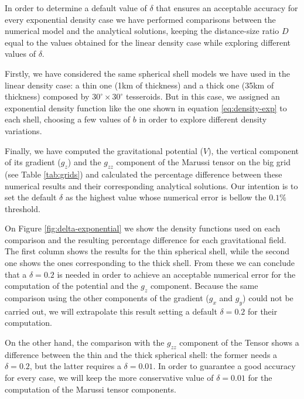 \documentclass[extra]{gji}
\begin{document}
In order to determine a default value of $\delta$ that ensures an 
acceptable accuracy for every exponential density case we have 
performed comparisons between the numerical model and the analytical 
solutions, keeping the distance-size ratio $D$ equal to the values 
obtained for the linear density case while exploring different values of 
$\delta$.

Firstly, we have considered the same spherical shell models we have 
used in the linear density case: a thin one (1km of thickness) and a 
thick one (35km of thickness) composed by $30^\circ \times 30^\circ$ 
tesseroids.
But in this case, we assigned an exponential density function like the 
one shown in equation \ref{eq:density-exp} to each shell, choosing 
a few values of $b$ in order to explore different density 
variations.

Finally, we have computed the gravitational potential ($V$), the 
vertical component of its gradient ($g_z$) and the $g_{zz}$ component of 
the Marussi tensor on the big grid (see Table \ref{tab:grids}) and 
calculated the percentage difference between these numerical results and 
their corresponding analytical solutions.
Our intention is to set the default $\delta$ as the highest value whose 
numerical error is bellow the $0.1\%$ threshold.

On Figure \ref{fig:delta-exponential} we show the density functions 
used on each comparison and the resulting percentage difference for each 
gravitational field.
The first column shows the results for the thin spherical shell, while the 
second one shows the ones corresponding to the thick shell.
From these we can conclude that a $\delta = 0.2$ is needed in order to 
achieve an acceptable numerical error for the computation of the 
potential and the $g_z$ component.
Because the same comparison using the other components of the gradient ($g_x$ 
and $g_y$) could not be carried out, we will extrapolate this result 
setting a default $\delta = 0.2$ for their computation.

On the other hand, the comparison with the $g_{zz}$ component of the 
Tensor shows a difference between the thin and the thick spherical 
shell: the former needs a $\delta = 0.2$, but the latter requires a 
$\delta = 0.01$.
In order to guarantee a good accuracy for every case, we will keep the 
more conservative value of $\delta = 0.01$ for the computation of the 
Marussi tensor components.
\end{document}
